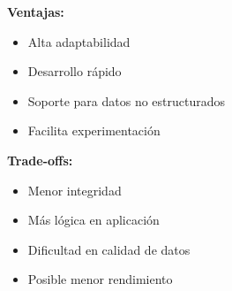 \documentclass[12pt]{article}
\begin{document}
\textbf{Ventajas:}
\begin{itemize}
\item Alta adaptabilidad
\item Desarrollo r\'apido
\item Soporte para datos no estructurados
\item Facilita experimentaci\'on
\end{itemize}

\textbf{Trade-offs:}
\begin{itemize}
\item Menor integridad
\item M\'as l\'ogica en aplicaci\'on
\item Dificultad en calidad de datos
\item Posible menor rendimiento
\end{itemize}
\end{document}
